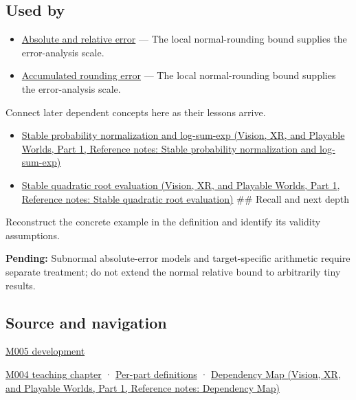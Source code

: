 \subsection{Used by}\label{appendix-bc44f7b42f42-used-by}

\hypertarget{appendix-bc44f7b42f42-used-by}{}

\begin{itemize}
\tightlist
\item
  \hyperref[appendix-3ae74e89b4e6]{Absolute and relative error} --- The local normal-rounding bound supplies the error-analysis scale.
\item
  \hyperref[appendix-f82e270791c8]{Accumulated rounding error} --- The local normal-rounding bound supplies the error-analysis scale.
\end{itemize}

Connect later dependent concepts here as their lessons arrive.

\begin{itemize}
\tightlist
\item
  \href{../07-Vision-XR-and-Playable-Worlds-P01/main.pdf\#appendix-d580b422240f}{Stable probability normalization and log-sum-exp (Vision, XR, and Playable Worlds, Part 1, Reference notes: Stable probability normalization and log-sum-exp)}
\item
  \href{../07-Vision-XR-and-Playable-Worlds-P01/main.pdf\#appendix-b9afba7f63e5}{Stable quadratic root evaluation (Vision, XR, and Playable Worlds, Part 1, Reference notes: Stable quadratic root evaluation)} \#\# Recall and next depth
\end{itemize}

Reconstruct the concrete example in the definition and identify its validity assumptions.

\textbf{Pending:} Subnormal absolute-error models and target-specific arithmetic require separate treatment; do not extend the normal relative bound to arbitrarily tiny results.

\subsection{Source and navigation}\label{appendix-bc44f7b42f42-source-and-navigation}

\hypertarget{appendix-bc44f7b42f42-source-and-navigation}{}

\hyperref[01-foundations-i-ch001-when-arithmetic-meets-uncertainty]{M005 development}

\hyperref[01-foundations-i-ch001-a-stretching-ruler-for-real-valued-quantities]{M004 teaching chapter} · \hyperref[appendix-fd090d982a15-m004---parts-61-76]{Per-part definitions} · \href{../07-Vision-XR-and-Playable-Worlds-P01/main.pdf\#appendix-4ad47bdd269a}{Dependency Map (Vision, XR, and Playable Worlds, Part 1, Reference notes: Dependency Map)}
